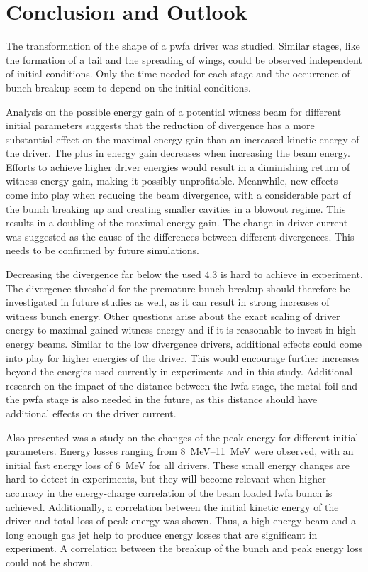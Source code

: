 \documentclass[bachelor_thesis]{subfiles}
\begin{document}
\chapter{Conclusion and Outlook} \label{chap:conclusion}
The transformation of the shape of a \gls{pwfa} driver was studied. Similar stages, like the formation of a tail and the spreading of wings, could be observed independent of initial conditions. 
Only the time needed for each stage and the occurrence of bunch breakup seem to depend on the initial conditions.

Analysis on the possible energy gain of a potential witness beam for different initial parameters suggests that the reduction of divergence has a more substantial effect on the maximal energy gain than an increased kinetic energy of the driver.
The plus in energy gain decreases when increasing the beam energy. Efforts to achieve higher driver energies would result in a diminishing return of witness energy gain, making it possibly unprofitable.
Meanwhile, new effects come into play when reducing the beam divergence, with a considerable part of the bunch breaking up and creating smaller cavities in a blowout regime. This results in a doubling of the maximal energy gain.
The change in driver current was suggested as the cause of the differences between different divergences. This needs to be confirmed by future simulations.

Decreasing the divergence far below the used \qty{4.3}{\mrad} is hard to achieve in experiment. The divergence threshold for the premature bunch breakup should therefore be investigated in future studies as well, as it can result in strong increases of witness bunch energy.
Other questions arise about the exact scaling of driver energy to maximal gained witness energy and if it is reasonable to invest in high-energy beams. Similar to the low divergence drivers, additional effects could come into play for higher energies of the driver.
This would encourage further increases beyond the energies used currently in experiments and in this study.
Additional research on the impact of the distance between the \gls{lwfa} stage, the metal foil and the \gls{pwfa} stage is also needed in the future, as this distance should have additional effects on the driver current.\medskip

Also presented was a study on the changes of the peak energy for different initial parameters. Energy losses ranging from \qtyrange{8}{11}{\MeV} were observed, with an initial fast energy loss of \qty{6}{\MeV} for all drivers.
These small energy changes are hard to detect in experiments, but they will become relevant when higher accuracy in the energy-charge correlation of the beam loaded \gls{lwfa} bunch is achieved.
Additionally, a correlation between the initial kinetic energy of the driver and total loss of peak energy was shown. Thus, a high-energy beam and a long enough gas jet help to produce energy losses that are significant in experiment.
A correlation between the breakup of the bunch and peak energy loss could not be shown.
\end{document}
